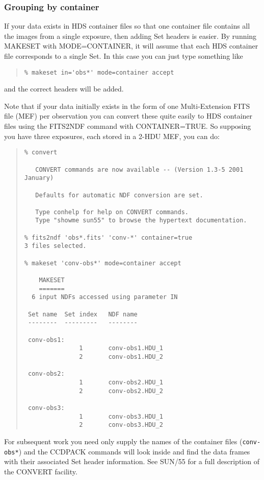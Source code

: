 \documentclass[twoside,11pt]{article}
\newcommand{\xref}[3]{#1}
\renewcommand{\_}{\texttt{\symbol{95}}}
\newenvironment{myquote}{\begin{quote}\begin{small}}{\end{small}\end{quote}}
\newcommand{\text}[1]{{\small \tt #1}}
\newcommand{\routine}[1]{{\sc #1}}
\begin{document}
\subsubsection{\label{makeset_container}Grouping by container}

If your data exists in HDS container files 
so that one container file contains all the images from a single 
exposure, then adding Set headers is easier.
By running \routine{MAKESET} 
with MODE=CONTAINER,
it will assume that each HDS container file corresponds to a single Set.
In this case you can just type something like
\begin{myquote}
\begin{verbatim}
% makeset in='obs*' mode=container accept
\end{verbatim}
\end{myquote}
and the correct headers will be added.

Note that if your data initially exists in the form of one 
Multi-Extension FITS file (MEF) per observation 
you can convert these quite easily to
HDS container files using the \xref{FITS2NDF}{sun55}{FITS2NDF} command
with CONTAINER=TRUE.  So supposing you have three exposures,
each stored in a 2-HDU MEF, you can do:
\begin{myquote}
\begin{verbatim}
% convert

   CONVERT commands are now available -- (Version 1.3-5 2001 January)

   Defaults for automatic NDF conversion are set.

   Type conhelp for help on CONVERT commands.
   Type "showme sun55" to browse the hypertext documentation.

% fits2ndf 'obs*.fits' 'conv-*' container=true
3 files selected.

% makeset 'conv-obs*' mode=container accept

    MAKESET
    =======
  6 input NDFs accessed using parameter IN

 Set name  Set index   NDF name
 --------  ---------   --------

 conv-obs1:
               1       conv-obs1.HDU_1
               2       conv-obs1.HDU_2

 conv-obs2:
               1       conv-obs2.HDU_1
               2       conv-obs2.HDU_2

 conv-obs3:
               1       conv-obs3.HDU_1
               2       conv-obs3.HDU_2
\end{verbatim}
\end{myquote}
For subsequent work you need only
supply the names of the container files (\text{conv-obs*})
and the CCDPACK commands will look inside and find the 
data frames with their 
associated Set header information.
See \xref{SUN/55}{sun55}{} for a full description of the CONVERT
facility.
\end{document}
